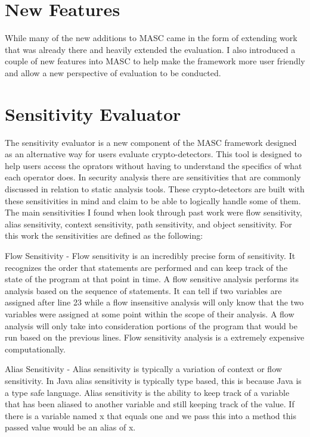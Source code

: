 \section{New Features}
\label{ch3:sec:new-features}

While many of the new additions to MASC came in the form of extending work that was already there and heavily extended the evaluation. I also introduced a couple of new features into MASC to help make the framework more user friendly and allow a new perspective of evaluation to be conducted.

\section{Sensitivity Evaluator}
\label{ch3:subsec:sensitities}

The sensitivity evaluator is a new component of the MASC framework designed as an alternative way for users evaluate crypto-detectors. This tool is designed to help users access the oprators without having to understand the specifics of what each operator does. In security analysis there are sensitivities that are commonly discussed in relation to static analysis tools. These crypto-detectors are built with these sensitivities in mind and claim to be able to logically handle some of them. The main sensitivities I found when look through past work were flow sensitivity, alias sensitivity, context sensitivity, path sensitivity, and object sensitivity. For this work the sensitivities are defined as the following:

Flow Sensitivity - Flow sensitivity is an incredibly precise form of sensitivity. It recognizes the order that statements are performed and can keep track of the state of the program at that point in time. A flow sensitive analysis performs its analysis based on the sequence of statements. It can tell if two variables are assigned after line 23 while a flow insensitive analysis will only know that the two variables were assigned at some point within the scope of their analysis. A flow analysis will only take into consideration portions of the program that would be run based on the previous lines. Flow sensitivity analysis is a extremely expensive computationally.

Alias Sensitivity - Alias sensitivity is typically a variation of context or flow sensitivity. In Java alias sensitivity is typically type based, this is because Java is a type safe language. Alias sensitivity is the ability to keep track of a variable that has been aliased to another variable and still keeping track of the value. If there is a variable named x that equals one and we pass this into a method this passed value would be an alias of x.

